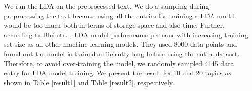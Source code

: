 \documentclass[conference]{IEEEtran}
\begin{document}
We ran the LDA on the preprocessed text. We do a sampling during preprocessing the text because using all the entries for training a LDA model would be too much both in terms of storage space and also time. Further, according to Blei etc. \cite{blei2003latent}, LDA model performance plateaus with increasing training set size as all other machine learning models. They used 8000 data points and found out the model is trained sufficiently long before using the entire dataset. Therefore, to avoid over-training the model, we randomly sampled 4145 data entry for LDA model training. We present the result for 10 and 20 topics as shown in Table \ref{result1} and Table \ref{result2}, respectively.

%
%



%
%
\end{document}
